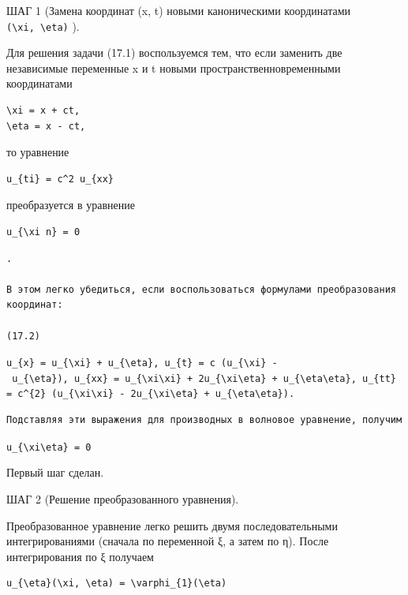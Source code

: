 \documentclass[
  ukrainian,
]{article}
\begin{document}
ШАГ 1 (Замена координат (x, t) новыми каноническими координатами
\texttt{(\textbackslash{}xi,\ \textbackslash{}eta)} ).

Для решения задачи (17.1) воспользуемся тем, что если заменить две
независимые переменные x и t новыми пространственновременными
координатами

\begin{verbatim}
\xi = x + ct,
\eta = x - ct,
\end{verbatim}

то уравнение

\begin{verbatim}
u_{ti} = c^2 u_{xx}
\end{verbatim}

преобразуется в уравнение

\begin{verbatim}
u_{\xi n} = 0
\end{verbatim}

\begin{verbatim}
.

В этом легко убедиться, если воспользоваться формулами преобразования координат:

(17.2)
\end{verbatim}

\texttt{u\_\{x\}\ =\ u\_\{\textbackslash{}xi\}\ +\ u\_\{\textbackslash{}eta\},\ u\_\{t\}\ =\ c\ (u\_\{\textbackslash{}xi\}\ -\ u\_\{\textbackslash{}eta\}),\ u\_\{xx\}\ =\ u\_\{\textbackslash{}xi\textbackslash{}xi\}\ +\ 2u\_\{\textbackslash{}xi\textbackslash{}eta\}\ +\ u\_\{\textbackslash{}eta\textbackslash{}eta\},\ u\_\{tt\}\ =\ c\^{}\{2\}\ (u\_\{\textbackslash{}xi\textbackslash{}xi\}\ -\ 2u\_\{\textbackslash{}xi\textbackslash{}eta\}\ +\ u\_\{\textbackslash{}eta\textbackslash{}eta\}).}

\begin{verbatim}
Подставляя эти выражения для производных в волновое уравнение, получим
\end{verbatim}

\texttt{u\_\{\textbackslash{}xi\textbackslash{}eta\}\ =\ 0}

Первый шаг сделан.

ШАГ 2 (Решение преобразованного уравнения).

Преобразованное уравнение легко решить двумя последовательными
интегрированиями (сначала по переменной ξ, а затем по η). После
интегрирования по ξ получаем

\begin{verbatim}
u_{\eta}(\xi, \eta) = \varphi_{1}(\eta)
\end{verbatim}
\end{document}
